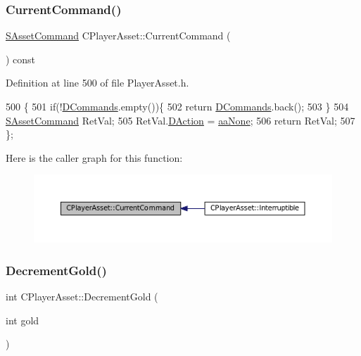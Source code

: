 \subsubsection{\texorpdfstring{Current\+Command()}{CurrentCommand()}}
{\footnotesize\ttfamily \hyperlink{structSAssetCommand}{S\+Asset\+Command} C\+Player\+Asset\+::\+Current\+Command (\begin{DoxyParamCaption}{ }\end{DoxyParamCaption}) const\hspace{0.3cm}{\ttfamily [inline]}}



Definition at line 500 of file Player\+Asset.\+h.


\begin{DoxyCode}
500                                             \{
501             \textcolor{keywordflow}{if}(!\hyperlink{classCPlayerAsset_a4d3b96106d3b1c1020f98005884d2a87}{DCommands}.empty())\{
502                 \textcolor{keywordflow}{return} \hyperlink{classCPlayerAsset_a4d3b96106d3b1c1020f98005884d2a87}{DCommands}.back();
503             \}
504             \hyperlink{structSAssetCommand}{SAssetCommand} RetVal;
505             RetVal.\hyperlink{structSAssetCommand_a8edd3b3d59a76d5514ba403bc8076a75}{DAction} = \hyperlink{GameDataTypes_8h_ab47668e651a3032cfb9c40ea2d60d670ac17cc5a0035320c060d7f8074143b507}{aaNone};
506             \textcolor{keywordflow}{return} RetVal;
507         \};
\end{DoxyCode}
Here is the caller graph for this function\+:
\nopagebreak
\begin{figure}[H]
\begin{center}
\leavevmode
\includegraphics[width=350pt]{classCPlayerAsset_ae2040e12e5319593c9a2d724c7b7eda0_icgraph}
\end{center}
\end{figure}
\hypertarget{classCPlayerAsset_ab29218b9af24ca9db186ee36f75ae7d4}{}\label{classCPlayerAsset_ab29218b9af24ca9db186ee36f75ae7d4} 
\subsubsection{\texorpdfstring{Decrement\+Gold()}{DecrementGold()}}
{\footnotesize\ttfamily int C\+Player\+Asset\+::\+Decrement\+Gold (\begin{DoxyParamCaption}\item[{int}]{gold }\end{DoxyParamCaption})\hspace{0.3cm}{\ttfamily [inline]}}



